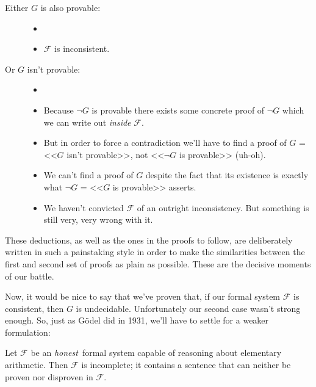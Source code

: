 \documentclass{article}
\theoremstyle{customstyle}
\newcommand{\F}{\ensuremath{\mathcal{F}}}
\begin{document}
\begin{description}
\begin{description}
\item[Either $G$ is also provable:]
\begin{itemize}
\item[]
\item $\F$ is inconsistent.
\end{itemize}
\item[Or $G$ isn't provable:]
\begin{itemize}
\item[]
\item Because $\neg G$ is provable there exists some concrete proof of $\neg G$ which we can write out \textit{inside} $\F$.
\item But in order to force a contradiction we'll have to find a proof of $G$ = <<$G$ isn't provable>>, not <<$\neg G$ is provable>> (uh-oh).
\item We can't find a proof of $G$ despite the fact that its existence is exactly what $\neg G$ = <<$G$ is provable>> asserts.
\item We haven't convicted $\F$ of an outright inconsistency. But something is still very, very wrong with it.
\end{itemize}
\end{description}
\end{description}

These deductions, as well as the ones in the proofs to follow, are deliberately written in such a painstaking style in order to make the similarities between the first and second set of proofs as plain as possible. These are the decisive moments of our battle.

Now, it would be nice to say that we've proven that, if our formal system $\F$ is consistent, then $G$ is undecidable. Unfortunately our second case wasn't strong enough. So, just as Gödel did in 1931, we'll have to settle for a weaker formulation:

\begin{theorem}
Let $\F$ be an \textit{honest}\footnotemark\ formal system capable of reasoning about elementary arithmetic. Then $\F$ is incomplete; it contains a sentence that can neither be proven nor disproven in $\F$.
\end{theorem}
\end{document}

